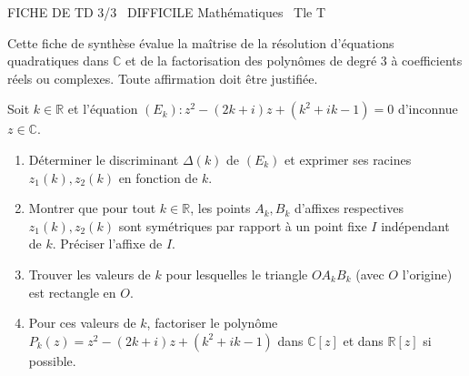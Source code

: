 \documentclass[11pt]{article}
\begin{document}
\begin{tcolorbox}[enhanced,colback=popink,colframe=popink,arc=10pt,boxrule=0pt,left=12pt,right=12pt,top=9pt,bottom=9pt]
{\color{white}\popxbold\small FICHE DE TD 3/3 \textbullet\ DIFFICILE \hfill Mathématiques \textbullet\ Tle T\par}
\end{tcolorbox}
\vspace{4pt}
Cette fiche de synthèse évalue la maîtrise de la résolution d'équations quadratiques dans $\mathbb{C}$ et de la factorisation des polynômes de degré 3 à coefficients réels ou complexes. Toute affirmation doit être justifiée.

\begin{exercice}
Soit $k \in \mathbb{R}$ et l'équation $(E_k) : z^2 - (2k + i)z + (k^2 + ik - 1) = 0$ d'inconnue $z \in \mathbb{C}$.
\begin{enumerate}
    \item Déterminer le discriminant $\Delta(k)$ de $(E_k)$ et exprimer ses racines $z_1(k), z_2(k)$ en fonction de $k$.
    \item Montrer que pour tout $k \in \mathbb{R}$, les points $A_k, B_k$ d'affixes respectives $z_1(k), z_2(k)$ sont symétriques par rapport à un point fixe $I$ indépendant de $k$. Préciser l'affixe de $I$.
    \item Trouver les valeurs de $k$ pour lesquelles le triangle $O A_k B_k$ (avec $O$ l'origine) est rectangle en $O$.
    \item Pour ces valeurs de $k$, factoriser le polynôme $P_k(z) = z^2 - (2k + i)z + (k^2 + ik - 1)$ dans $\mathbb{C}[z]$ et dans $\mathbb{R}[z]$ si possible.
\end{enumerate}
\end{exercice}
\end{document}
